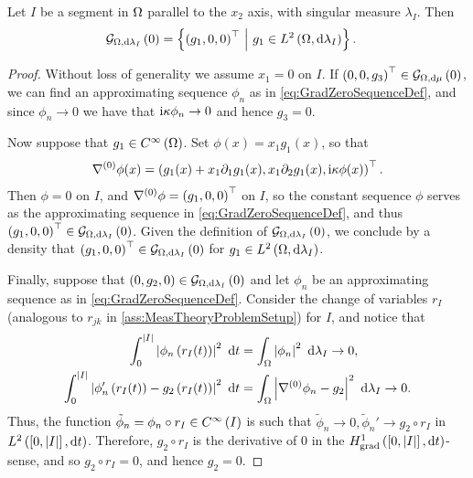 \begin{prop} \label{prop:3DGradZeroSegment}
	Let $I$ be a segment in $\Omega$ parallel to the $x_2$ axis, with singular measure $\lambda_I$.
	Then 
	\begin{align*}
		\mathcal{G}_{ \Omega, \mathrm{d}\lambda_I}\left( 0 \right) &= \left\{  \left( g_1, 0, 0 \right)^{\top} \ \middle\vert \  g_1\in L^{2}\left( \Omega,\mathrm{d}\lambda_I \right)  \right\}.
	\end{align*}
\end{prop}
\begin{proof}
	Without loss of generality we assume $x_1=0$ on $I$.
	If $\left( 0,0,g_3 \right)^\top\in\mathcal{G}_{ \Omega, \mathrm{d}\mu}\left( 0 \right)$, we can find an approximating sequence $\phi_n$ as in \eqref{eq:GradZeroSequenceDef}, and since $\phi_n\rightarrow 0$ we have that $\mathrm{i}\kappa\phi_n\rightarrow0$ and hence $g_3=0$.
	
	Now suppose that $g_1\in C^{\infty}\left( \Omega \right)$.
	Set $\phi(x) = x_1 g_1(x)$, so that 
	\begin{align*}
		\nabla^{(0)}\phi(x) = \left( g_1(x) + x_1 \partial_1 g_1(x), x_1 \partial_2 g_1(x), \mathrm{i}\kappa\phi(x) \right)^\top.
	\end{align*}
	Then $\phi = 0$ on $I$, and $\nabla^{(0)}\phi = \left( g_1, 0, 0 \right)^\top$ on $I$, so the constant sequence $\phi$ serves as the approximating sequence in \eqref{eq:GradZeroSequenceDef}, and thus $\left( g_1, 0, 0 \right)^{\top}\in\mathcal{G}_{ \Omega, \mathrm{d}\lambda_I}\left( 0 \right)$.
	Given the definition of $\mathcal{G}_{ \Omega, \mathrm{d}\lambda_I}\left( 0 \right)$, we conclude by a density that $\left( g_1, 0, 0 \right)^{\top}\in\mathcal{G}_{ \Omega, \mathrm{d}\lambda_I}\left( 0 \right)$ for $g_1\in L^{2}\left( \Omega,\mathrm{d}\lambda_I \right)$.
	
	Finally, suppose that $\left( 0, g_2, 0 \right)\in\mathcal{G}_{ \Omega, \mathrm{d}\lambda_I}\left( 0 \right)$ and let $\phi_n$ be an approximating sequence as in \eqref{eq:GradZeroSequenceDef}.
	Consider the change of variables $r_I$ (analogous to $r_{jk}$ in \ref{ass:MeasTheoryProblemSetup}) for $I$, and notice that
	\begin{align*}
		\int_0^{\left\lvert I \right\rvert} \left\lvert \phi_n\left( r_I(t) \right) \right\rvert^2 \ \mathrm{d} t &= \int_{\Omega} \left\lvert \phi_n \right\rvert^2  \ \mathrm{d}\lambda_I \rightarrow 0, \\
		\int_0^{\left\lvert I \right\rvert} \left\lvert  \phi_n'\left( r_I(t) \right) - g_2\left( r_I(t) \right)  \right\rvert^2 \ \mathrm{d} t &= \int_{\Omega} \left\lvert \nabla^{(0)}\phi_n - g_2 \right\rvert^2  \ \mathrm{d}\lambda_I \rightarrow 0.		
	\end{align*}
	Thus, the function $\tilde{\phi}_n = \phi_n\circ r_I \in C^{\infty}\left( I \right)$ is such that $\tilde{\phi}_n\rightarrow 0, \tilde{\phi}_n'\rightarrow g_2\circ r_I$ in $L^{2}\left( \left[ 0,\left\lvert I \right\rvert \right],\mathrm{d}t \right)$.
	Therefore, $g_2\circ r_I$ is the derivative of $0$ in the $H^1_\mathrm{grad}\left( \left[ 0,\left\lvert I \right\rvert \right], \mathrm{d}t \right)$-sense, and so $g_2\circ r_I = 0$, and hence $g_2 = 0$.
\end{proof}

